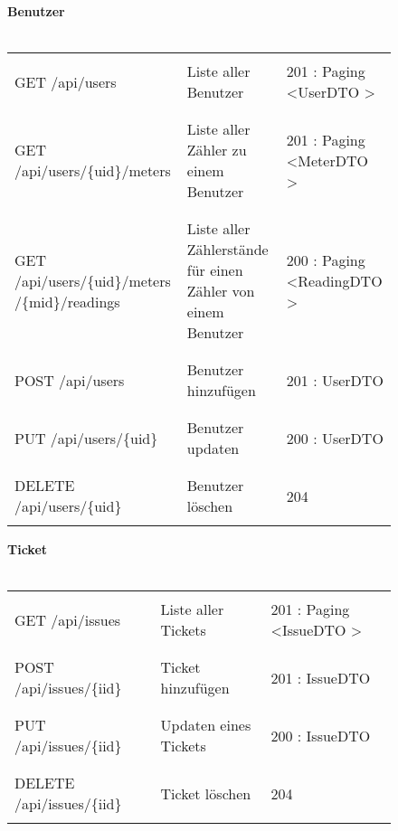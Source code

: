 \begin{figure}[H]
	\textbf{Benutzer}\\ \\
	\begin{tabularx}{\textwidth}{X | X | X}
	\hline \\
	GET /api/users & Liste aller Benutzer & 201 : Paging \textless UserDTO \textgreater\\ \\ \hline
	\\ GET /api/users/\{uid\}/meters & Liste aller Zähler zu einem Benutzer & 201 : Paging \textless MeterDTO \textgreater  \\ \\ \hline
	\\ GET /api/users/\{uid\}/meters /\{mid\}/readings & Liste aller Zählerstände für einen Zähler von einem Benutzer &  200 : Paging \textless ReadingDTO \textgreater \\ \\ \hline
	\\ POST /api/users & Benutzer hinzufügen &201 : UserDTO \\ \\ \hline
	\\ PUT /api/users/\{uid\} & Benutzer updaten & 200 : UserDTO\\ \\ \hline
	\\ DELETE /api/users/\{uid\} & Benutzer löschen & 204\\ \\ \hline
	\end{tabularx}
\end{figure}

\begin{figure}[H]
	\textbf{Ticket}\\ \\
	\begin{tabularx}{\textwidth}{X | X | X}
	\hline \\
	GET /api/issues & Liste aller Tickets & 201 : Paging \textless IssueDTO \textgreater\\ \\ \hline
	\\ POST /api/issues/\{iid\} & Ticket hinzufügen & 201 : IssueDTO \\ \\ \hline
	\\ PUT /api/issues/\{iid\} & Updaten eines Tickets & 200 : IssueDTO \\ \\ \hline
	\\ DELETE /api/issues/\{iid\} & Ticket löschen & 204 \\ \\ \hline
	
	\end{tabularx}
\end{figure}

